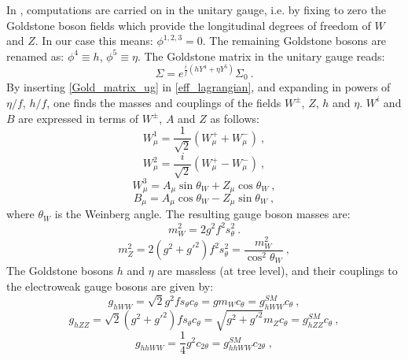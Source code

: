In \cite{Cacciapaglia:2014uja}, computations are carried on in the unitary gauge, i.e. by fixing to zero the Goldstone boson fields which provide the longitudinal degrees of freedom of $W$ and $Z$. In our case this means: $\phi^{1,2,3} = 0$. The remaining Goldstone bosons are renamed as: $\phi^4 \equiv h$, $\phi^5 \equiv \eta$. The Goldstone matrix in the unitary gauge reads:
\begin{equation}
\Sigma = e^{\frac{i}{f} (h Y^4 + \eta Y^5)} \Sigma_0 \: .
\label{Gold_matrix_ug}
\end{equation}
%
By inserting \ref{Gold_matrix_ug} in \ref{eff_lagrangian}, and expanding in powers of $\eta/f$, $h/f$, one finds the masses and couplings of the fields $W^{\pm}$, $Z$, $h$ and $\eta$. $W^i$ and $B$ are expressed in terms of $W^{\pm}$, $A$ and $Z$ as follows:
%
\begin{equation}
W^1_{\mu} = \frac{1}{\sqrt 2} (W^+_{\mu} + W^-_{\mu}) \: ,
\end{equation}
%
\begin{equation}
W^2_{\mu} = \frac{i}{\sqrt 2} (W^+_{\mu} - W^-_{\mu}) \: ,
\end{equation}
%
\begin{equation}
W^3_{\mu} = A_{\mu} \sin \theta_W + Z_{\mu} \cos \theta_W \: ,
\end{equation}
%
\begin{equation}
B_{\mu} = A_{\mu} \cos \theta_W - Z_{\mu} \sin \theta_W \: ,
\end{equation}
%
where $\theta_W$ is the Weinberg angle.
The resulting gauge boson masses are:
\begin{equation}
m^2_{W} = 2 g^2 f^2 s_{\theta}^2 \: .
\end{equation}
\begin{equation}
m^2_Z = 2 (g^2 + {g'}^2) f^2 s_{\theta}^2 = \frac{m_W^2}{\cos^2\theta_W} \: ,
\end{equation}
%
The Goldstone bosons $h$ and $\eta$ are massless (at tree level), and their couplings to the electroweak gauge bosons are given by:
\begin{equation}
g_{hWW} = \sqrt 2 g^2 f s_{\theta} c_{\theta} = g m_W c_{\theta} = g^{SM}_{hWW} c_{\theta} \: ,
\end{equation}
\begin{equation}
g_{hZZ} = \sqrt 2 (g^2 + {g'}^2) f s_{\theta} c_{\theta} = \sqrt{g^2 + {g'}^2} m_Z c_{\theta} = g^{SM}_{hZZ} c_{\theta} \: ,
\end{equation}
\begin{equation}
g_{hhWW} = \frac{1}{4} g^2 c_{2 \theta} = g_{hhWW}^{SM} c_{2 \theta} \; ,
\end{equation}
